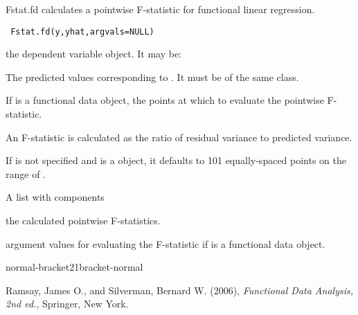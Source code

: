 \begin{Description}\relax
Fstat.fd calculates a pointwise F-statistic for functional linear regression.
\end{Description}
\begin{Usage}
\begin{verbatim} Fstat.fd(y,yhat,argvals=NULL)\end{verbatim}
\end{Usage}
\begin{Arguments}
\begin{ldescription}
\item[\code{y}] the dependent variable object.  It may be:

\item[\code{yhat}] The predicted values corresponding to . It must be of the same class.

\item[\code{argvals}] If  is a functional data object, the points at which to evaluate
the pointwise F-statistic.

\end{ldescription}
\end{Arguments}
\begin{Details}\relax
An F-statistic is calculated as the ratio of residual variance to predicted
variance.

If  is not specified and  is a  object,
it defaults to 101 equally-spaced points on the range of .
\end{Details}
\begin{Value}
A list with components
\begin{ldescription}
\item[\code{F}] the calculated pointwise F-statistics.
\item[\code{argvals}] argument values for evaluating the F-statistic if  is
a functional data object.

\end{ldescription}

normal-bracket21bracket-normal
\end{Value}
\begin{Source}\relax
Ramsay, James O., and Silverman, Bernard W. (2006), \emph{Functional
Data Analysis, 2nd ed.}, Springer, New York.
\end{Source}
\begin{SeeAlso}\relax
{}
\end{SeeAlso}

